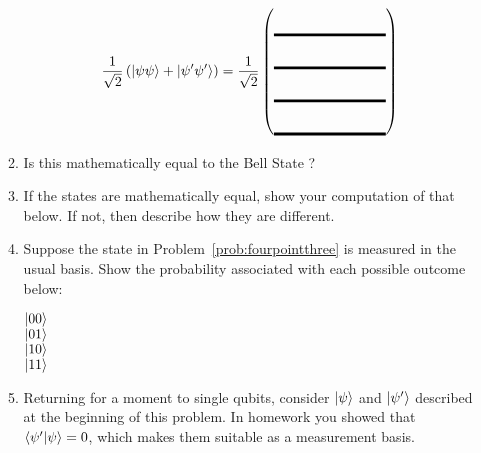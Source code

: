 \documentclass[12pt]{article}
\def\TwoQBlank{%
\DQB{\Blank[8em]}{\Blank[8em]}{\Blank[8em]}{\Blank[8em]}%
}
\begin{document}
\begin{enumerate}
\begin{enumerate}[label=\theenumi.\arabic*]
\[
\TwoSup{\psi\psi}{\psi'\psi'} = \RootTwo{}\TwoQBlank{}
\]
\item{} Is this mathematically equal to the Bell State ? \Blank{}
\item{} If the states are mathematically equal, show your computation of that below.  If not, then describe how they are different.
\LeaveSpace{}
\item{} Suppose the state in Problem~\ref{prob:fourpointthree} is measured in the usual \TensProd{\PauliZ}{\PauliZ} basis.  Show the probability associated with each possible outcome below:
\begin{description}
    \item[$\ket{00}$] \Blank[3in]{}
    \item[$\ket{01}$] \Blank[3in]{}
    \item[$\ket{10}$] \Blank[3in]{}
    \item[$\ket{11}$] \Blank[3in]{}
\end{description}
\item\label{prob:matrix} Returning for a moment to single qubits, consider $\ket{\psi}$ and $\ket{\psi'}$ described at the beginning of this problem. In homework you showed that $\braket{\psi'|\psi}=0$, which makes them suitable as a measurement basis.


\end{enumerate}
\end{enumerate}
\end{document}
